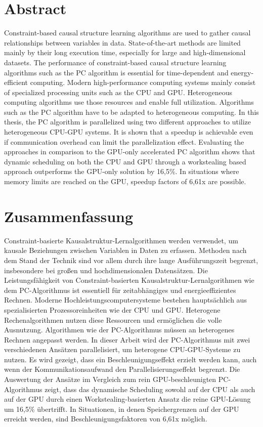 \chapter*{Abstract}
Constraint-based causal structure learning algorithms are used to gather causal relationships between variables in data. State-of-the-art methods are limited mainly by their long execution time, especially for large and high-dimensional datasets. The performance of constraint-based causal structure learning algorithms such as the PC algorithm is essential for time-dependent and energy-efficient computing. Modern high-performance computing systems mainly consist of specialized processing units such as the CPU and GPU. Heterogeneous computing algorithms use those resources and enable full utilization. Algorithms such as the PC algorithm have to be adapted to heterogeneous computing. In this thesis, the PC algorithm is parallelized using two different approaches to utilize heterogeneous CPU-GPU systems. It is shown that a speedup is achievable even if communication overhead can limit the parallelization effect. Evaluating the approaches in comparison to the GPU-only accelerated PC algorithm shows that dynamic scheduling on both the CPU and GPU through a workstealing based approach outperforms the GPU-only solution by 16,5\%. In situations where memory limits are reached on the GPU, speedup factors of 6,61x are possible.

\chapter*{Zusammenfassung}
Constraint-basierte Kausalstruktur-Lernalgorithmen werden verwendet, um kausale Beziehungen zwischen Variablen in Daten zu erfassen. Methoden nach dem Stand der Technik sind vor allem durch ihre lange Ausführungszeit begrenzt, insbesondere bei großen und hochdimensionalen Datensätzen. Die Leistungsfähigkeit von Constraint-basierten Kausalstruktur-Lernalgorithmen wie dem PC-Algorithmus ist essentiell für zeitabhängiges und energieeffizientes Rechnen. Moderne Hochleistungscomputersysteme bestehen hauptsächlich aus spezialisierten Prozessoreinheiten wie der CPU und GPU. Heterogene Rechenalgorithmen nutzen diese Ressourcen und ermöglichen die volle Ausnutzung. Algorithmen wie der PC-Algorithmus müssen an heterogenes Rechnen angepasst werden. In dieser Arbeit wird der PC-Algorithmus mit zwei verschiedenen Ansätzen parallelisiert, um heterogene CPU-GPU-Systeme zu nutzen. Es wird gezeigt, dass ein Beschleunigungseffekt erzielt werden kann, auch wenn der Kommunikationsaufwand den Parallelisierungseffekt begrenzt. Die Auswertung der Ansätze im Vergleich zum rein GPU-beschleunigten PC-Algorithmus zeigt, dass das dynamische Scheduling sowohl auf der CPU als auch auf der GPU durch einen Workstealing-basierten Ansatz die reine GPU-Lösung um 16,5\% übertrifft. In Situationen, in denen Speichergrenzen auf der GPU erreicht werden, sind Beschleunigungsfaktoren von 6,61x möglich.
